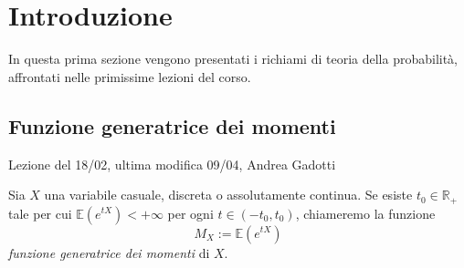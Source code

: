\chapter{Introduzione}
In questa prima sezione vengono presentati i richiami di teoria della probabilità, affrontati nelle primissime lezioni del corso.
\section{Funzione generatrice dei momenti}
Lezione del 18/02, ultima modifica 09/04, Andrea Gadotti

\begin{definizione}[fgm]
Sia \(X\) una variabile casuale, discreta o assolutamente continua.
Se esiste $t_0 \in \mathbb{R}_{+}$ tale per cui \(\mathbb{E}(e^{tX}) < +\infty\) per ogni \(t \in (-t_0 , t_0)\), chiameremo la funzione 
\begin{equation}
  M_X := \mathbb{E}(e^{tX})
\end{equation}
\emph{funzione generatrice dei momenti} di \(X\).
\end{definizione}

